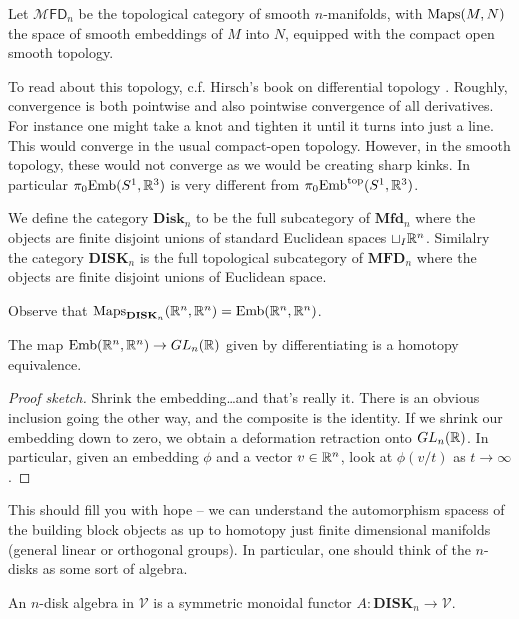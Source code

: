 \documentclass{amsart}
\begin{document}
\begin{definition}
    Let $\mathcal{M}\mathsf{FD}_n$ be the topological category of smooth $n$-manifolds, with
    $\operatorname{Maps}(M,N)$ the space of smooth embeddings of $M$ into $N$, equipped with the
    compact open smooth topology.
\end{definition}

To read about this topology, c.f. Hirsch's book
on differential topology \cite{hirsch}. Roughly, convergence is both pointwise and also
pointwise convergence of all derivatives.
For instance one might take a knot and tighten it until it turns into just
a line. This would converge in the usual compact-open topology. However, in
the smooth topology, these would not converge as we would be creating sharp
kinks. In particular $\pi_0\text{Emb}(S^1,\mathbb{R}^3)$ is very different from
$\pi_0\text{Emb}^\text{top}(S^1,\mathbb{R}^3)$.

\begin{definition}
    We define the category $\mathbf{Disk}_n$ to be the full subcategory of
    $\mathbf{Mfd}_n$ where the objects are finite disjoint unions of standard
    Euclidean spaces $\sqcup_I\mathbb{R}^n$. Similalry the category $\mathbf{DISK}_n$
    is the full topological subcategory of $\mathbf{MFD}_n$ where the objects
    are finite disjoint unions of Euclidean space.
\end{definition}

Observe that $\operatorname{Maps}_{\mathbf{DISK}_n}(\mathbb{R}^n,\mathbb{R}^n)=\text{Emb}(\mathbb{R}^n,\mathbb{R}^n)$.
\begin{lemma}
    The map $\text{Emb}(\mathbb{R}^n,\mathbb{R}^n)\to GL_n(\mathbb{R})$ given by differentiating
    is a homotopy equivalence.
\end{lemma}
\begin{proof}[Proof sketch]
    Shrink the embedding\ldots and that's really it. There is an obvious inclusion going
    the other way, and the composite is the identity. If we shrink our embedding
    down to zero, we obtain a deformation retraction onto $GL_n(\mathbb{R})$. In particular,
    given an embedding $\phi$ and a vector $v\in\mathbb{R}^n$, look at $\phi(v/t)$ as $t\to\infty$.
\end{proof}

This should fill you with hope -- we can understand the automorphism spacess of the
building block objects as up to homotopy just finite dimensional manifolds (general
linear or orthogonal groups). In particular, one should think of the $n$-disks as
some sort of algebra.

\begin{definition}
    An $n$-disk algebra in $\mathcal{V}$ is a symmetric monoidal functor
    $A:\mathbf{DISK}_n\to\mathcal{V}$.
\end{definition}
\end{document}
